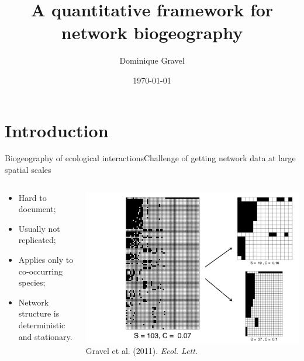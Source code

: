 \documentclass{eecslides}
\title[Network biogeography]{A quantitative framework for network biogeography}
\author[D. Gravel]{Dominique Gravel}
\institute{UQAR -- Canada Research Chair in Ecosystem ecology}
\date{\today}
\begin{document}
	\begin{frame}[plain]
		\titlepage
	\end{frame}


	\section{Introduction}


	\begin{frame}{Biogeography of ecological interactions}{Challenge of getting network data at large spatial scales}
 	    	\begin{columns}
			\begin{column}{0.35\textwidth}			
				\begin{itemize}
					\item Hard to document;
					\item Usually not replicated;
					\item Applies only to co-occurring species;
					\item Network structure is deterministic and stationary.
				\end{itemize}
			\end{column}
			\begin{column}{0.65\textwidth}
				\begin{center}
					\includegraphics[height=0.55\textheight]{havens_sampling}\\
					\footnotesize{Gravel et al. (2011). \textit{Ecol. Lett.}}
				\end{center}
			\end{column}				
		\end{columns}	   
	\end{frame}
\end{document}
